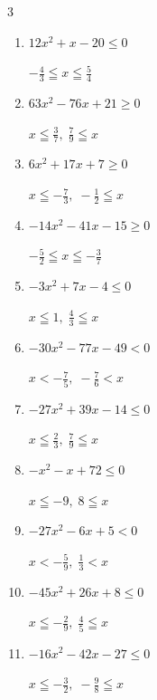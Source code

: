 \begin{multicols}{3}
\begin{enumerate}
        $\displaystyle -\frac{7}{8} \leqq x \leqq \frac{4}{5}$

  \item $12x^{2}+x-20\leq 0$

        $\displaystyle -\frac{4}{3} \leqq x \leqq \frac{5}{4}$

\columnbreak %

\resetques

  \item $63x^{2}-76x+21\geq 0$

        $\displaystyle x \leqq \frac{3}{7} , \; \frac{7}{9} \leqq x$

  \item $6x^{2}+17x+7\geq 0$

        $\displaystyle x \leqq -\frac{7}{3} , \; -\frac{1}{2} \leqq x$

  \item $-14x^{2}-41x-15\geq 0$

        $\displaystyle -\frac{5}{2} \leqq x \leqq -\frac{3}{7}$

  \item $-3x^{2}+7x-4\leq 0$

        $\displaystyle x \leqq 1 , \; \frac{4}{3} \leqq x$

  \item $-30x^{2}-77x-49<0$

        $\displaystyle x < -\frac{7}{5} , \; -\frac{7}{6} < x$

  \item $-27x^{2}+39x-14\leq 0$

        $\displaystyle x \leqq \frac{2}{3} , \; \frac{7}{9} \leqq x$

  \item $-x^{2}-x+72\leq 0$

        $\displaystyle x \leqq -9 , \; 8 \leqq x$

  \item $-27x^{2}-6x+5<0$

        $\displaystyle x < -\frac{5}{9} , \; \frac{1}{3} < x$

  \item $-45x^{2}+26x+8\leq 0$

        $\displaystyle x \leqq -\frac{2}{9} , \; \frac{4}{5} \leqq x$

  \item $-16x^{2}-42x-27\leq 0$

        $\displaystyle x \leqq -\frac{3}{2} , \; -\frac{9}{8} \leqq x$

\columnbreak %


\end{enumerate}
\end{multicols}
